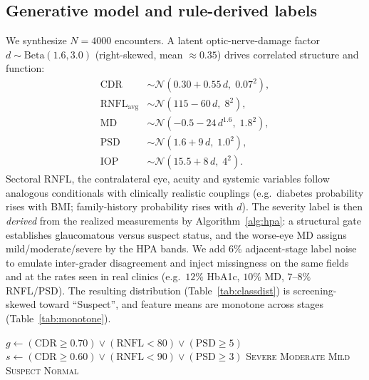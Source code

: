 \documentclass[10pt,twocolumn]{article}
\begin{document}
\subsection{Generative model and rule-derived labels}
We synthesize $N{=}4000$ encounters. A latent optic-nerve-damage factor
$d\sim\mathrm{Beta}(1.6,3.0)$ (right-skewed, mean $\approx0.35$) drives correlated
structure and function:
\begin{align}
\mathrm{CDR} &\sim \mathcal{N}(0.30+0.55\,d,\;0.07^2),\\
\mathrm{RNFL}_{\text{avg}} &\sim \mathcal{N}(115-60\,d,\;8^2),\\
\mathrm{MD} &\sim \mathcal{N}(-0.5-24\,d^{1.6},\;1.8^2),\\
\mathrm{PSD} &\sim \mathcal{N}(1.6+9\,d,\;1.0^2),\\
\mathrm{IOP} &\sim \mathcal{N}(15.5+8\,d,\;4^2).
\end{align}
Sectoral RNFL, the contralateral eye, acuity and systemic variables follow analogous
conditionals with clinically realistic couplings (e.g.\ diabetes probability rises
with BMI; family-history probability rises with $d$). The severity label is then
\emph{derived} from the realized measurements by Algorithm~\ref{alg:hpa}: a structural
gate establishes glaucomatous versus suspect status, and the worse-eye MD assigns
mild/moderate/severe by the HPA bands. We add $6\%$ adjacent-stage label noise to
emulate inter-grader disagreement and inject missingness on the same fields and at
the rates seen in real clinics (e.g.\ $12\%$ HbA1c, $10\%$ MD, $7$--$8\%$ RNFL/PSD).
The resulting distribution (Table~\ref{tab:classdist}) is screening-skewed toward
``Suspect'', and feature means are monotone across stages
(Table~\ref{tab:monotone}).

\begin{algorithm}[t]
\caption{HPA-based severity labelling (worse-eye MD)}
\label{alg:hpa}
\begin{algorithmic}[1]
\State $g \gets (\mathrm{CDR}\!\ge\!0.70)\lor(\mathrm{RNFL}\!<\!80)\lor(\mathrm{PSD}\!\ge\!5)$
\State $s \gets (\mathrm{CDR}\!\ge\!0.60)\lor(\mathrm{RNFL}\!<\!90)\lor(\mathrm{PSD}\!\ge\!3)$
   \State \Return \textsc{Severe}
   \State \Return \textsc{Moderate}
  \Else \State \Return \textsc{Mild} \EndIf
{} \State \Return \textsc{Suspect}
\Else \State \Return \textsc{Normal}
\EndIf
\end{algorithmic}
\end{algorithm}
\end{document}
